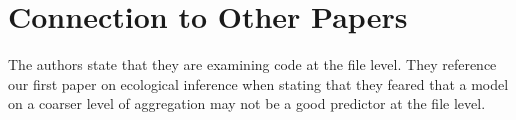 \documentclass[english]{article}
\begin{document}
\section*{Connection to Other Papers}
The authors state that they are examining code at the file level. They reference our first paper on ecological inference \cite{Posnett} when stating that they feared that a model on a coarser level of aggregation may not be a good predictor at the file level. 



\end{document}
